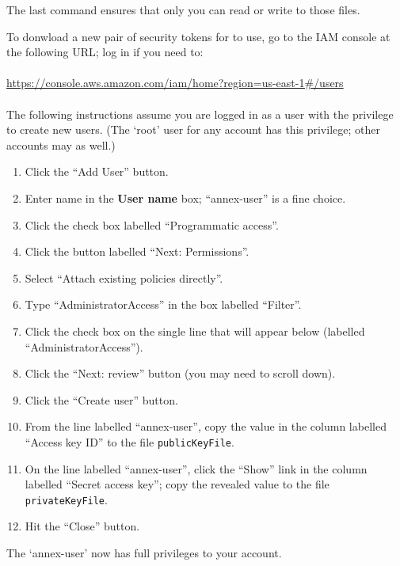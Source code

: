 
The last command ensures that only you can read or write to those files.

To donwload a new pair of security tokens for  to use, go to
the IAM console at the following URL; log in if you need to:\\
\\
\url{https://console.aws.amazon.com/iam/home?region=us-east-1#/users}\\
\\
The following instructions assume you are logged in as a user
with the privilege to create new users.  (The `root' user for any account has
this privilege; other accounts may as well.)

\begin{enumerate}
\item Click the ``Add User'' button.
\item Enter name in the \textbf{User name} box; ``annex-user'' is a fine choice.
\item Click the check box labelled ``Programmatic access''.
\item Click the button labelled ``Next: Permissions''.
\item Select ``Attach existing policies directly''.
\item Type ``AdministratorAccess'' in the box labelled ``Filter''.
\item Click the check box on the single line that will appear below (labelled ``AdministratorAccess'').
\item Click the ``Next: review'' button (you may need to scroll down).
\item Click the ``Create user'' button.
\item From the line labelled ``annex-user'', copy the value in the column labelled ``Access key ID'' to the file \texttt{publicKeyFile}.
\item On the line labelled ``annex-user'', click the ``Show'' link in the column labelled ``Secret access key''; copy the revealed value to the file \texttt{privateKeyFile}.
\item Hit the ``Close'' button.
\end{enumerate}

The `annex-user' now has full privileges to your account.

